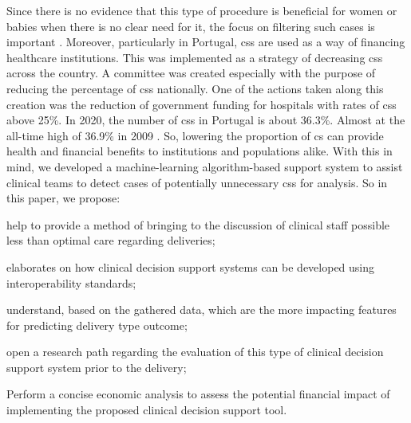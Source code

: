 Since there is no evidence that this type of procedure is beneficial for women or babies when there is no clear need for it, the focus on filtering such cases is important \cite{chenNonClinicalInterventions2018}.
Moreover, particularly in Portugal, \acp{cs} are used as a way of financing healthcare institutions. This was implemented as a strategy of decreasing \ac{cs}s across the country. A committee was created especially with the purpose of reducing the percentage of \acp{cs} nationally. One of the actions taken along this creation was the reduction of government funding for hospitals with rates of \acp{cs} above 25\%.
In 2020, the number of \acp{cs} in Portugal is about 36.3\%. Almost at the all-time high of 36.9\% in 2009 \cite{pordatacesarianas}.
So, lowering the proportion of \ac{cs} can provide health and financial benefits to institutions and populations alike. With this in mind, we developed a  machine-learning algorithm-based support system to assist clinical teams to detect cases of potentially unnecessary \acp{cs} for analysis. So in this paper, we propose:
\begin{myitemize}
    \item help to provide a method of bringing to the discussion of clinical staff possible less than optimal care regarding deliveries;
    \item elaborates on how clinical decision support systems can be developed using interoperability standards;
    \item understand, based on the gathered data, which are the more impacting features for predicting delivery type outcome;
    \item open a research path regarding the evaluation of this type of clinical decision support system prior to the delivery;
    \item Perform a concise economic analysis to assess the potential financial impact of implementing the proposed clinical decision support tool.

\end{myitemize}